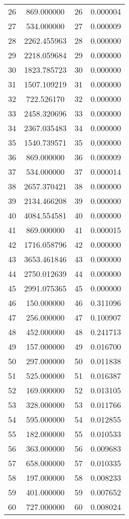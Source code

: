 \documentclass[12pt]{article}
\begin{document}
\begin{longtable}{@{}cccc@{}}
26 & 869.000000 & 26 & 0.000004 \\
27 & 534.000000 & 27 & 0.000009 \\
28 & 2262.455963 & 28 & 0.000000 \\
29 & 2218.059684 & 29 & 0.000000 \\
30 & 1823.785723 & 30 & 0.000000 \\
31 & 1507.109219 & 31 & 0.000000 \\
32 & 722.526170 & 32 & 0.000000 \\
33 & 2458.320696 & 33 & 0.000000 \\
34 & 2367.035483 & 34 & 0.000000 \\
35 & 1540.739571 & 35 & 0.000000 \\
36 & 869.000000 & 36 & 0.000009 \\
37 & 534.000000 & 37 & 0.000014 \\
38 & 2657.370421 & 38 & 0.000000 \\
39 & 2134.466208 & 39 & 0.000000 \\
40 & 4084.554581 & 40 & 0.000000 \\
41 & 869.000000 & 41 & 0.000015 \\
42 & 1716.058796 & 42 & 0.000000 \\
43 & 3653.461846 & 43 & 0.000000 \\
44 & 2750.012639 & 44 & 0.000000 \\
45 & 2991.075365 & 45 & 0.000000 \\
46 & 150.000000 & 46 & 0.311096 \\
47 & 256.000000 & 47 & 0.100907 \\
48 & 452.000000 & 48 & 0.241713 \\
49 & 157.000000 & 49 & 0.016700 \\
50 & 297.000000 & 50 & 0.011838 \\
51 & 525.000000 & 51 & 0.016387 \\
52 & 169.000000 & 52 & 0.013105 \\
53 & 328.000000 & 53 & 0.011766 \\
54 & 595.000000 & 54 & 0.012855 \\
55 & 182.000000 & 55 & 0.010533 \\
56 & 363.000000 & 56 & 0.009683 \\
57 & 658.000000 & 57 & 0.010335 \\
58 & 197.000000 & 58 & 0.008233 \\
59 & 401.000000 & 59 & 0.007652 \\
60 & 727.000000 & 60 & 0.008024 \\

\end{longtable}
\end{document}
